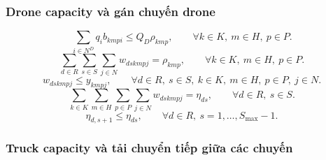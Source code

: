 \documentclass[12pt,a4paper]{article}
\begin{document}
\subsubsection{Drone capacity và gán chuyến drone}

\begin{equation}
  \sum_{i\in N^D}q_i b_{kmpi}\le Q_D\rho_{kmp}, \qquad \forall k\in K,\ m\in H,\ p\in P.
\end{equation}
\begin{equation}
  \sum_{d\in R}\sum_{s\in S}\sum_{j\in N} w_{dskmpj} = \rho_{kmp}, \qquad \forall k\in K,\ m\in H,\ p\in P.
\end{equation}
\begin{equation}
  w_{dskmpj}\le y_{kmpj}, \qquad \forall d\in R,\ s\in S,\ k\in K,\ m\in H,\ p\in P,\ j\in N.
\end{equation}
\begin{equation}
  \sum_{k\in K}\sum_{m\in H}\sum_{p\in P}\sum_{j\in N}w_{dskmpj} =\eta_{ds}, \qquad \forall d\in R,\ s\in S.
\end{equation}
\begin{equation}
  \eta_{d,s+1}\le \eta_{ds}, \qquad \forall d\in R,\ s=1,\ldots,S_{\max}-1.
\end{equation}

\subsubsection{Truck capacity và tải chuyển tiếp giữa các chuyến}
\end{document}
